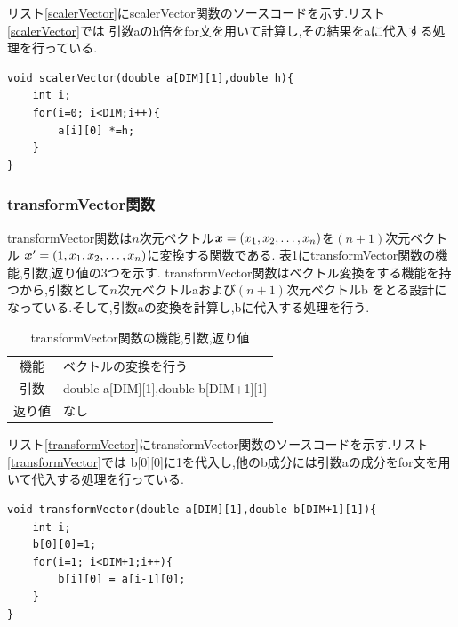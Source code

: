 \documentclass[a4j]{jarticle}
\def\vector#1{\mbox{\boldmath $#1$}}
\begin{document}
          リスト\ref{scalerVector}にscalerVector関数のソースコードを示す.リスト\ref{scalerVector}では
        引数aのh倍をfor文を用いて計算し,その結果をaに代入する処理を行っている.
    \begin{lstlisting}[basicstyle=\ttfamily\footnotesize, frame=single,label=scalerVector,caption=scalerVector関数のコード]
void scalerVector(double a[DIM][1],double h){
    int i;
    for(i=0; i<DIM;i++){
        a[i][0] *=h;
    }
}
    \end{lstlisting}

      \subsubsection{transformVector関数}
      transformVector関数は$n$次元ベクトル$\vector{x}=(x_1,x_2,\dots,x_n)$を$(n+1)$次元ベクトル
      $\vector{x}'=(1,x_1,x_2,\dots,x_n)$に変換する関数である.
      表\ref{transformVectortable}にtransformVector関数の機能,引数,返り値の3つを示す.
      transformVector関数はベクトル変換をする機能を持つから,引数として$n$次元ベクトルaおよび$(n+1)$次元ベクトルb
      をとる設計になっている.そして,引数aの変換を計算し,bに代入する処理を行う.
        \begin{table}[H]
          \caption{transformVector関数の機能,引数,返り値}
          \label{transformVectortable}
          \begin{center}
              \begin{tabular}{c|l}\hline
                機能 & ベクトルの変換を行う\\
                引数 & double a[DIM][1],double b[DIM+1][1] \\
                返り値 & なし\\ \hline
              \end{tabular}
          \end{center}
          \end{table}

          リスト\ref{transformVector}にtransformVector関数のソースコードを示す.リスト\ref{transformVector}では
        b[0][0]に1を代入し,他のb成分には引数aの成分をfor文を用いて代入する処理を行っている.
    \begin{lstlisting}[basicstyle=\ttfamily\footnotesize, frame=single,label=transformVector,caption=transformVector関数のコード]
void transformVector(double a[DIM][1],double b[DIM+1][1]){
    int i;
    b[0][0]=1;
    for(i=1; i<DIM+1;i++){
        b[i][0] = a[i-1][0];
    }
}
    \end{lstlisting}
\end{document}
